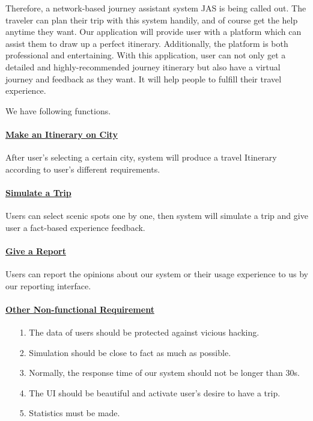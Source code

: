 \documentclass[10pt]{article}
\begin{document}
Therefore, a network-based journey assistant system JAS is being called out. The traveler can plan their trip with this system handily, and of course get the help anytime they want. Our application will provide user with a platform which can assist them to draw up a perfect itinerary. Additionally, the platform is both professional and entertaining. With this application, user can not only get a detailed and highly-recommended journey itinerary but also have a virtual journey and feedback as they want. It will help people to fulfill their travel experience. 

We have following functions. 

\paragraph{\underline{Make an Itinerary on City}} After user’s selecting a certain city, system will produce a travel Itinerary according to user’s different requirements.

\paragraph{\underline{Simulate a Trip}} Users can select scenic spots one by one, then system will simulate a trip and give user a fact-based experience feedback.

\paragraph{\underline{Give a Report}} Users can report the opinions about our system or their usage experience to us by our reporting interface.

\paragraph{\underline{Other Non-functional Requirement}}
\begin{itemize}
	\item[1.] The data of users should be protected against vicious hacking.
	\item[2.]	Simulation should be close to fact as much as possible.
	\item[3.]	Normally, the response time of our system should not be longer than 30s.
	\item[4.]	The UI should be beautiful and activate user’s desire to have a trip.
	\item[5.]	Statistics must be made.
	
\end{itemize}
\end{document}
